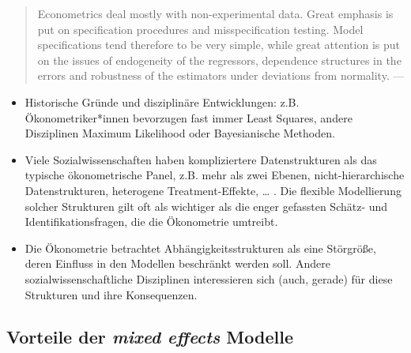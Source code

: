 \documentclass[
]{book}
\begin{document}
\begin{quote}
Econometrics deal mostly with non-experimental data. Great emphasis is put on specification procedures and misspecification testing. Model specifications tend therefore to be very simple, while great attention is put on the issues of endogeneity of the regressors, dependence structures in the errors and robustness of the estimators under deviations from normality. --- \citet{plm2008}
\end{quote}

\begin{itemize}
\item
  Historische Gründe und disziplinäre Entwicklungen: z.B. Ökonometriker*innen bevorzugen fast immer Least Squares, andere Disziplinen Maximum Likelihood oder Bayesianische Methoden.
\item
  Viele Sozialwissenschaften haben kompliziertere Datenstrukturen als das typische ökonometrische Panel, z.B. mehr als zwei Ebenen, nicht-hierarchische Datenstrukturen, heterogene Treatment-Effekte, \ldots{} . Die flexible Modellierung solcher Strukturen gilt oft als wichtiger als die enger gefassten Schätz- und Identifikationsfragen, die die Ökonometrie umtreibt.
\item
  Die Ökonometrie betrachtet Abhängigkeitsstrukturen als eine Störgröße, deren Einfluss in den Modellen beschränkt werden soll. Andere sozialwissenschaftliche Disziplinen interessieren sich (auch, gerade) für diese Strukturen und ihre Konsequenzen.
\end{itemize}

\hypertarget{vorteile-der-mixed-effects-modelle}{%
\subsection{\texorpdfstring{Vorteile der \emph{mixed effects} Modelle}{Vorteile der mixed effects Modelle}}\label{vorteile-der-mixed-effects-modelle}}
\end{document}

